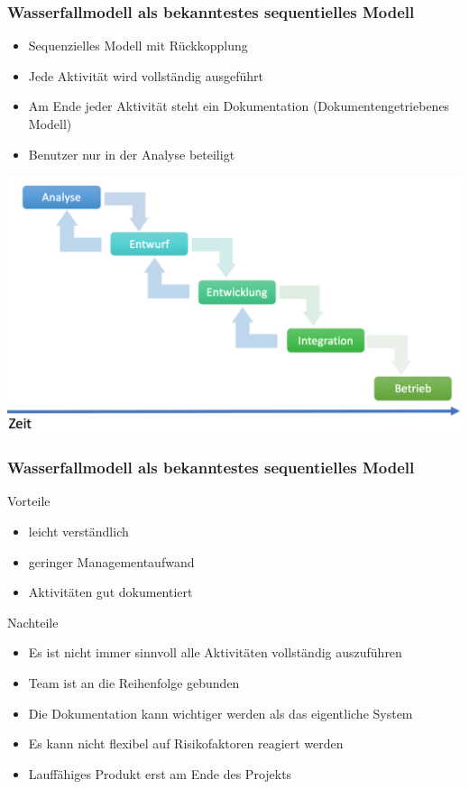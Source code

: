 \begin{frame}
\frametitle{Wasserfallmodell als bekanntestes sequentielles Modell}
	\begin{itemize}
		\item Sequenzielles Modell mit Rückkopplung
		\item Jede Aktivität wird vollständig ausgeführt
		\item Am Ende jeder Aktivität steht ein Dokumentation
		(Dokumentengetriebenes Modell)
		\item Benutzer nur in der Analyse beteiligt
	\end{itemize}
	\center\includegraphics[width=1\textwidth,
		keepaspectratio=true]{bilder/wasserfall_model.png}
\end{frame}

\begin{frame}
\frametitle{Wasserfallmodell als bekanntestes sequentielles Modell}
	Vorteile
	\begin{itemize}
		\item leicht verständlich
		\item geringer Managementaufwand
		\item Aktivitäten gut dokumentiert
	\end{itemize}
	\bigskip
	Nachteile
	\begin{itemize}
		\item Es ist nicht immer sinnvoll alle Aktivitäten vollständig auszuführen
		\item Team ist an die Reihenfolge gebunden
		\item Die Dokumentation kann wichtiger werden als das eigentliche System
		\item Es kann nicht flexibel auf Risikofaktoren reagiert werden
		\item Lauffähiges Produkt erst am Ende des Projekts
	\end{itemize}
\end{frame}

